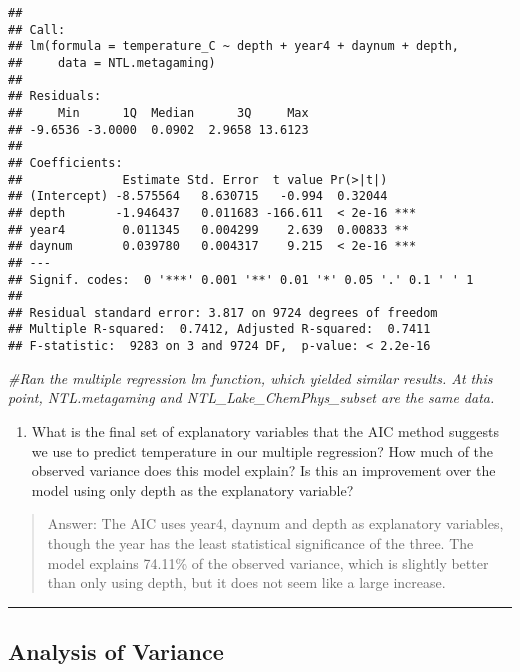 \documentclass[
]{article}
\newenvironment{Shaded}{\begin{snugshade}}{\end{snugshade}}
\newcommand{\CommentTok}[1]{\textcolor[rgb]{0.56,0.35,0.01}{\textit{#1}}}
\providecommand{\tightlist}{%
  \setlength{\itemsep}{0pt}\setlength{\parskip}{0pt}}
\begin{document}
\begin{verbatim}
## 
## Call:
## lm(formula = temperature_C ~ depth + year4 + daynum + depth, 
##     data = NTL.metagaming)
## 
## Residuals:
##     Min      1Q  Median      3Q     Max 
## -9.6536 -3.0000  0.0902  2.9658 13.6123 
## 
## Coefficients:
##              Estimate Std. Error  t value Pr(>|t|)    
## (Intercept) -8.575564   8.630715   -0.994  0.32044    
## depth       -1.946437   0.011683 -166.611  < 2e-16 ***
## year4        0.011345   0.004299    2.639  0.00833 ** 
## daynum       0.039780   0.004317    9.215  < 2e-16 ***
## ---
## Signif. codes:  0 '***' 0.001 '**' 0.01 '*' 0.05 '.' 0.1 ' ' 1
## 
## Residual standard error: 3.817 on 9724 degrees of freedom
## Multiple R-squared:  0.7412, Adjusted R-squared:  0.7411 
## F-statistic:  9283 on 3 and 9724 DF,  p-value: < 2.2e-16
\end{verbatim}

\begin{Shaded}
\begin{Highlighting}[]
\CommentTok{\#Ran the multiple regression lm function, which yielded similar results. At this point, NTL.metagaming and NTL\_Lake\_ChemPhys\_subset are the same data. }
\end{Highlighting}
\end{Shaded}

\begin{enumerate}
\def\labelenumi{\arabic{enumi}.}
\setcounter{enumi}{10}
\tightlist
\item
  What is the final set of explanatory variables that the AIC method
  suggests we use to predict temperature in our multiple regression? How
  much of the observed variance does this model explain? Is this an
  improvement over the model using only depth as the explanatory
  variable?
\end{enumerate}

\begin{quote}
Answer: The AIC uses year4, daynum and depth as explanatory variables,
though the year has the least statistical significance of the three. The
model explains 74.11\% of the observed variance, which is slightly
better than only using depth, but it does not seem like a large
increase.
\end{quote}

\begin{center}\rule{0.5\linewidth}{0.5pt}\end{center}

\hypertarget{analysis-of-variance}{%
\subsection{Analysis of Variance}\label{analysis-of-variance}}
\end{document}
